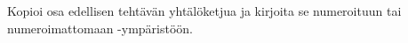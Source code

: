     \begin{harj}
        Kopioi osa edellisen tehtävän yhtälöketjua ja kirjoita se numeroituun tai numeroimattomaan -ympäristöön. 
    \end{harj}
